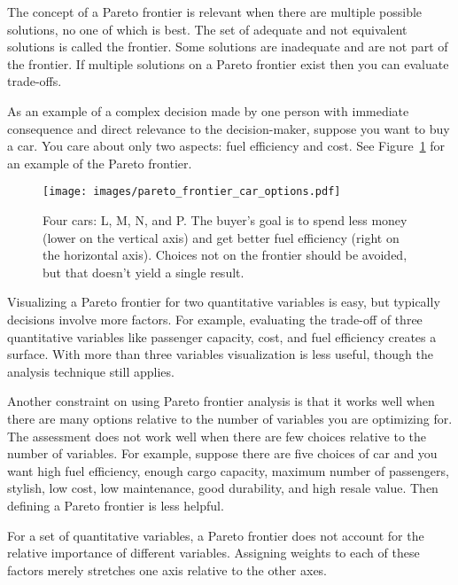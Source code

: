 The concept of a Pareto frontier is relevant when there are multiple possible solutions, no one of which is best. The set of adequate and not equivalent solutions is called the frontier. Some solutions are inadequate and are not part of the frontier. 
\iftoggle{WPinmargin}{\marginpar{$>$Wikipedia: Pareto frontier}}{}
If multiple solutions on a Pareto frontier exist then you can evaluate trade-offs. 

As an example of a complex decision made by one person with immediate consequence and direct relevance to the decision-maker, suppose you want to buy a car. You care about only two aspects: fuel efficiency and cost. See Figure~\ref{fig:pareto_frontier_cars} for an example of the Pareto frontier.

\begin{figure}[ht]
    \centering
    \texttt{[image: images/pareto\_frontier\_car\_options.pdf]}
    \caption{Four cars: L, M, N, and P. The buyer's goal is to spend less money (lower on the vertical axis) and get better fuel efficiency (right on the horizontal axis). Choices not on the frontier should be avoided, but that doesn't yield a single result.}
    \label{fig:pareto_frontier_cars}
\end{figure}

Visualizing a Pareto frontier for two quantitative variables is easy, but typically decisions involve more factors. For example, evaluating the trade-off of three quantitative variables like 
passenger capacity, cost, and fuel efficiency creates a surface. With more than three variables visualization is less useful, though the analysis technique still applies. 

Another constraint on using Pareto frontier analysis is that it works well when there are many options relative to the number of variables you are optimizing for. 
The assessment does not work well when there are few choices relative to the number of variables. For example, suppose there are five choices of car and you want high fuel efficiency, enough cargo capacity, maximum number of passengers, stylish, low cost, low maintenance, good durability, and high resale value. Then defining a Pareto frontier is less helpful.

For a set of quantitative variables, a Pareto frontier does not account for the relative importance of different variables. Assigning weights to each of these factors merely stretches one axis relative to the other axes. 

